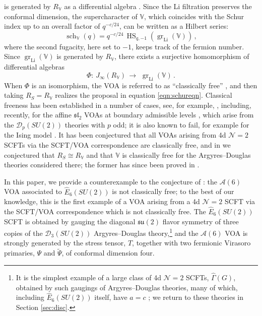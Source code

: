 \documentclass[12pt]{article}
\numberwithin{equation}{section}
\numberwithin{figure}{section}
\theoremstyle{plain}
\theoremstyle{definition}
\begin{document}
is generated by $R_{\mathbb{V}}$ as a differential algebra \cite{MR2172688}. Since the Li filtration preserves the conformal dimension, the supercharacter of $\mathbb{V}$, which coincides with the Schur index up to an overall factor of $q^{-c/24}$, can be written as a Hilbert series:
\begin{equation}
    \operatorname{sch}_{\mathbb{V}}(q) = q^{-c/24} \, \operatorname{HS}_{q,-1}(\operatorname{gr}_{\operatorname{Li}}(\mathbb{V})) \,,
\end{equation}
where the second fugacity, here set to $-1$, keeps track of the fermion number. Since $\operatorname{gr}_{\operatorname{Li}}(\mathbb{V})$ is generated by $R_{\mathbb{V}}$, there exists a surjective homomorphism of differential algebras
\begin{equation}\label{eqn:CF}
    \Phi :\, J_\infty(R_{\mathbb{V}}) \,\rightarrow\, \,\operatorname{gr}_{\operatorname{Li}}(\mathbb{V}) \,.
\end{equation}
When $\Phi$ is an isomorphism, the VOA is referred to as ``classically free'' \cite{MR4321999,MR4779563}, and then taking $R_S = R_{\mathbb{V}}$ realizes the proposal in equation \eqref{eqn:schureqn}. Classical freeness has been established in a number of cases, see, for example, \cite{MR4779563,MR4668791,MR4340951,MR4256406,MR4806362,kanade2026classicalfreeness}, including, recently, for the affine $\mathfrak{sl}_2$ VOAs at boundary admissible levels \cite{arakawa2026clfrsl2}, which arise from the $\mathcal{D}_p(SU(2))$ theories with $p$ odd; it is also known to fail, for example for the Ising model \cite{MR4589087}. It has been conjectured \cite{RastelliTalk1,RastelliTalk2} that all VOAs arising from 4d $\mathcal{N}=2$ SCFTs via the SCFT/VOA correspondence are classically free, and in \cite{Kang:2026ona,Kang:2026ney} we conjectured that $R_S \cong R_\mathbb{V}$ and that $\mathbb{V}$ is classically free for the Argyres--Douglas theories considered there; the former has since been proved in \cite{Arakawa:2026wwu}. 

In this paper, we provide a counterexample to the conjecture of \cite{RastelliTalk1,RastelliTalk2}: the $\mathcal{A}(6)$ VOA associated to $\widehat{E}_6(SU(2))$ is not classically free; to the best of our knowledge, this is the first example of a VOA arising from a 4d $\mathcal{N}=2$ SCFT via the SCFT/VOA correspondence which is not classically free. The $\widehat{E}_6(SU(2))$ SCFT is obtained by gauging the diagonal $\mathfrak{su}(2)$ flavor symmetry of three copies of the $\mathcal{D}_3(SU(2))$ Argyres--Douglas theory,\footnote{It is the simplest example of a large class of 4d $\mathcal{N}=2$ SCFTs, $\widehat{\Gamma}(G)$, obtained by such gaugings of Argyres--Douglas theories, many of which, including $\widehat{E}_6(SU(2))$ itself, have $a = c$ \cite{Kang:2021lic,Kang:2022vab}; we return to these theories in Section \ref{sec:disc}.} and the $\mathcal{A}(6)$ VOA is strongly generated by the stress tensor, $T$, together with two fermionic Virasoro primaries, $\Psi$ and $\widetilde{\Psi}$, of conformal dimension four.
\end{document}

